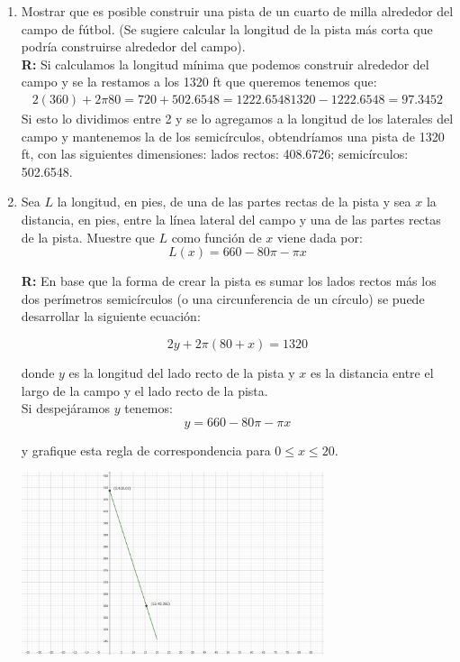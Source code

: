 \documentclass[12pt]{article}
\begin{document}
\begin{enumerate}
    \item Mostrar que es posible construir una pista de un cuarto de milla alrededor del campo de fútbol. (Se sugiere calcular la longitud de la pista más corta que podría construirse alrededor del campo).\\
        {\bf R:} Si calculamos la longitud mínima que podemos construir alrededor del campo y se la restamos a los 1320 ft que queremos tenemos que:
        \begin{align*}
        2(360)+2\pi 80 = 720 + 502.6548 = 1222.6548
        1320-1222.6548 = 97.3452
        \end{align*}
    Si esto lo dividimos entre 2 y se lo agregamos a la longitud de los laterales del campo y mantenemos la de los semicírculos, obtendríamos una pista de 1320 ft, con las siguientes dimensiones: lados rectos: 408.6726; semicírculos: 502.6548.
    
    \item Sea \( L \) la longitud, en pies, de una de las partes rectas de la pista y sea \( x \) la distancia, en pies, entre la línea lateral del campo y una de las partes rectas de la pista. Muestre que \( L \) como función de \( x \) viene dada por:
    \[
    L(x) = 660 - 80 \pi - \pi x
    \]
    
    {\bf R:} En base que la forma de crear la pista es sumar los lados rectos más los dos perímetros semicírculos (o una circunferencia de un círculo) se puede desarrollar la siguiente ecuación:
    
    \[
    2y+2\pi(80+x)=1320
    \]
    
    donde $y$ es la longitud del lado recto de la pista y $x$ es la distancia entre el largo de la campo y el lado recto de la pista.\\
    Si despejáramos $y$ tenemos:
    \[
    y=660-80\pi-\pi x
    \]
    
    y grafique esta regla de correspondencia para \( 0 \leq x \leq 20 \). 
    
    \includegraphics[width=0.7\textwidth, center]{graficapista.png}
     

\end{enumerate}
\end{document}
